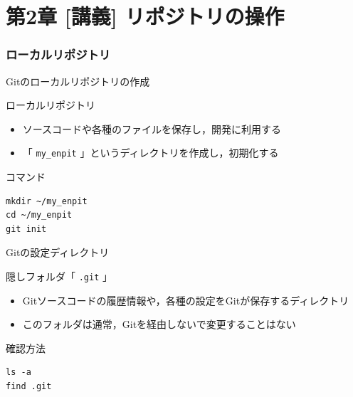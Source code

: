 \documentclass[t, aspectratio=169]{beamer}
\begin{document}
\part{第2章 [講義] リポジトリの操作}
\label{sec-2}
\section{ローカルリポジトリ}
\label{sec-2-1}
\begin{frame}[fragile,label=sec-2-1-1]{Gitのローカルリポジトリの作成}
 \begin{block}{ローカルリポジトリ}
\begin{itemize}
\item ソースコードや各種のファイルを保存し，開発に利用する
\item 「 \texttt{my\_enpit} 」というディレクトリを作成し，初期化する
\end{itemize}
\end{block}
\begin{block}{コマンド}
\begin{verbatim}
mkdir ~/my_enpit
cd ~/my_enpit
git init
\end{verbatim}
\end{block}
\end{frame}

\begin{frame}[fragile,label=sec-2-1-2]{Gitの設定ディレクトリ}
 \begin{block}{隠しフォルダ「 \texttt{.git} 」}
\begin{itemize}
\item Gitソースコードの履歴情報や，各種の設定をGitが保存するディレクトリ
\item このフォルダは通常，Gitを経由しないで変更することはない
\end{itemize}
\end{block}
\begin{block}{確認方法}
\begin{verbatim}
ls -a
find .git
\end{verbatim}
\end{block}
\end{frame}
\end{document}
